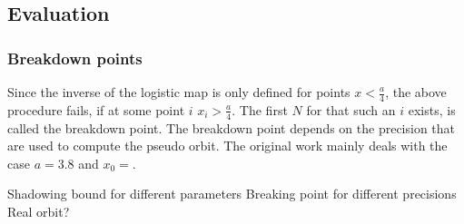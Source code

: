 \subsection{Evaluation}
  \subsubsection{Breakdown points}
  Since the inverse of the logistic map is only defined for points $x < \frac{a}{4}$, the above procedure fails, if at some point $i$ $x_i > \frac{a}{4}$. The first $N$ for that such an $i$ exists, is called the breakdown point.
  The breakdown point depends on the precision that are used to compute the pseudo orbit. 
  The original work mainly deals with the case $a=3.8$ and $x_0 = $.

  Shadowing bound for different parameters
  Breaking point for different precisions
  Real orbit?
